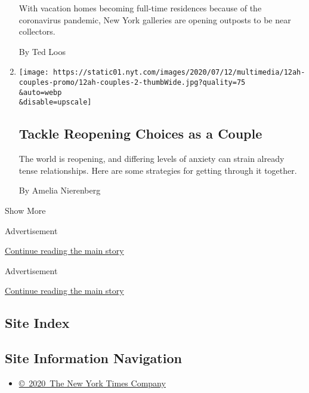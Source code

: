 \begin{enumerate}
  With vacation homes becoming full-time residences because of the
  coronavirus pandemic, New York galleries are opening outposts to be
  near collectors.

  By Ted Loos
\item
  \href{/2020/07/11/at-home/couples-coronavirus-pandemic.html}{}

  \texttt{[image: https://static01.nyt.com/images/2020/07/12/multimedia/12ah-couples-promo/12ah-couples-2-thumbWide.jpg?quality=75\\\&auto=webp\\\&disable=upscale]}

  \hypertarget{tackle-reopening-choices-as-a-couple}{%
  \subsection{Tackle Reopening Choices as a
  Couple}\label{tackle-reopening-choices-as-a-couple}}

  The world is reopening, and differing levels of anxiety can strain
  already tense relationships. Here are some strategies for getting
  through it together.

  By Amelia Nierenberg
\end{enumerate}

Show More

Advertisement

\protect\hyperlink{after-mid2}{Continue reading the main story}

Advertisement

\protect\hyperlink{after-mktg}{Continue reading the main story}

\hypertarget{site-index}{%
\subsection{Site Index}\label{site-index}}

\hypertarget{site-information-navigation}{%
\subsection{Site Information
Navigation}\label{site-information-navigation}}

\begin{itemize}
\tightlist
\item
  \href{https://help.nytimes.com/hc/en-us/articles/115014792127-Copyright-notice}{©~2020~The
  New York Times Company}
\end{itemize}

